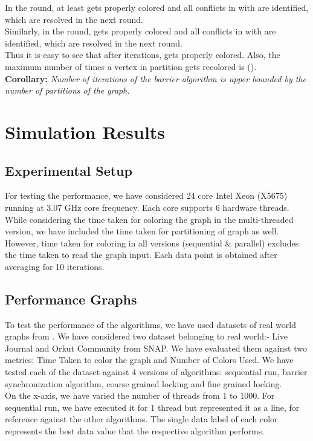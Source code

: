 \documentclass[a4paper,11pt]{article}
\begin{document}
\newline
In the  round, at least  gets properly colored and all conflicts in  with  are identified, which are resolved in the next round. \\Similarly, in the  round,  gets properly colored and all conflicts in  with  are identified, which are resolved in the next round. \\
\newline
Thus it is easy to see that after  iterations,  gets properly colored. Also, the maximum number of times a vertex in partition  gets recolored is (). \\
\newline
\textbf{Corollary:} \textit{Number of iterations of the barrier algorithm is upper bounded by the number of partitions of the graph.}

\section{Simulation Results}
\subsection{Experimental Setup}
For testing the performance, we have considered 24 core Intel Xeon (X5675) running at 3.07 GHz core frequency. Each core supports 6 hardware threads. While considering the time taken for coloring the graph in the multi-threaded version, we have included the time taken for partitioning of graph as well. However, time taken for coloring in all versions (sequential \& parallel) excludes the time taken to read the graph input. Each data point is obtained after averaging for 10 iterations.
\subsection{Performance Graphs}
To test the performance of the algorithms, we have used datasets of real world graphs from \cite{snapnets}. We have considered two dataset belonging to real world:- Live Journal and Orkut Community from SNAP. We have evaluated them against two metrics: Time Taken to color the graph and Number of Colors Used. We have tested each of the dataset against 4 versions of algorithms: sequential run, barrier synchronization algorithm, coarse grained locking and fine grained locking.\\
On the x-axis, we have varied the number of threads from 1 to 1000. For sequential run, we have executed it for 1 thread but represented it as a line, for reference against the other algorithms. The single data label of each color represents the best data value that the respective algorithm performs. \\
\end{document}
